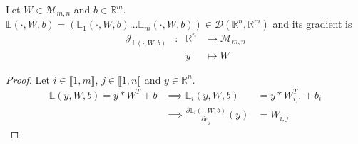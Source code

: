 \documentclass[11pt,en]{elegantpaper}
\newcommand{\Real}{\mathbb{R}}
\begin{document}
\begin{proposition}
  {\normalfont
    Let $W \in \mathcal{M}_{m,n}$ and $b \in \Real^m$.
    $\mathbb{L}(\cdot,W,b) = (\mathbb{L}_1(\cdot,W,b) \ldots \mathbb{L}_m(\cdot,W,b)) \in \mathcal{D}(\Real^n, \Real^m)$
    and its gradient is \begin{equation}\label{prop:densel_y_differential}
      \begin{array}{llll}
        \mathcal{J}_{\mathbb{L}(\cdot,W,b)} & : & \Real^n  & \longrightarrow \mathcal{M}_{m,n} \\
        &   & y & \longmapsto W
      \end{array}
    \end{equation}
  }
\end{proposition}

\begin{proof}
  Let $i \in \llbracket 1,m \rrbracket$, $j \in \llbracket 1,n \rrbracket$
  and $y \in \Real^n$. \begin{equation*}
    \begin{array}{lll}
      \mathbb{L}(y,W,b) = y * W^T + b & \implies \mathbb{L}_i(y,W,b) & = y * W_{i,:}^T + b_i \\
      & \implies \frac{\partial \mathbb{L}_i(\cdot,W,b)}{\partial e_j} (y) & = W_{i,j}
    \end{array}
  \end{equation*}
\end{proof}
\end{document}
